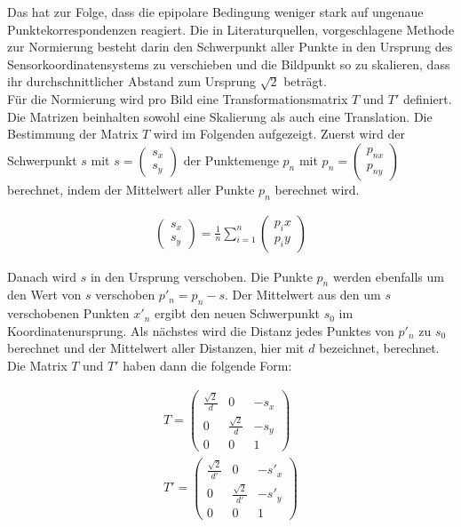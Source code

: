 Das hat zur Folge, dass die epipolare Bedingung  weniger stark auf ungenaue Punktekorrespondenzen reagiert. Die in Literaturquellen, vorgeschlagene Methode zur Normierung besteht darin den Schwerpunkt aller Punkte in den Ursprung des Sensorkoordinatensystems zu verschieben und die Bildpunkt so zu skalieren, dass ihr durchschnittlicher Abstand zum Ursprung $\sqrt{2}$ beträgt\cite{HZ,Ferid,Brooks}.\\


Für die Normierung wird pro Bild eine Transformationsmatrix $T$ und $T'$ definiert. Die Matrizen beinhalten sowohl eine Skalierung als auch eine Translation. Die Bestimmung der Matrix $T$ wird im Folgenden aufgezeigt. Zuerst wird der Schwerpunkt $s$ mit $s=\begin{pmatrix}
s_x\\
s_y
\end{pmatrix}$ der Punktemenge $p_n$ mit $p_n = \begin{pmatrix}
p_{nx}\\
p_{ny}
\end{pmatrix}$ berechnet, indem der Mittelwert aller Punkte $p_n$ berechnet wird.

\begin{gather}
	\begin{pmatrix}
		s_x\\
		s_y
	\end{pmatrix} = \frac{1}{n} \sum_{i = 1}^{n} \begin{pmatrix}
	p_ix\\
	p_iy
\end{pmatrix}
\end{gather}

Danach wird $s$ in den Ursprung verschoben. Die Punkte $p_n$ werden ebenfalls um den Wert von $s$ verschoben $p'_n = p_n - s$. Der Mittelwert aus den um $s$ verschobenen Punkten $x'_n$ ergibt den neuen Schwerpunkt $s_0$ im Koordinatenursprung. Als nächstes wird die Distanz jedes Punktes von $p'_n$ zu $s_0$ berechnet und der Mittelwert aller Distanzen, hier mit $d$ bezeichnet, berechnet. Die Matrix $T$ und $T'$ haben dann die folgende Form:

\begin{gather}
	T = \begin{pmatrix}
		\frac{\sqrt{2}}{d}&0&-s_x\\
		0&\frac{\sqrt{2}}{d}&-s_y\\
		0&0&1
	\end{pmatrix}\\
	T' = \begin{pmatrix}
	\frac{\sqrt{2}}{d'}&0&-s'_x\\
	0&\frac{\sqrt{2}}{d'}&-s'_y\\
	0&0&1
\end{pmatrix}
\end{gather}


